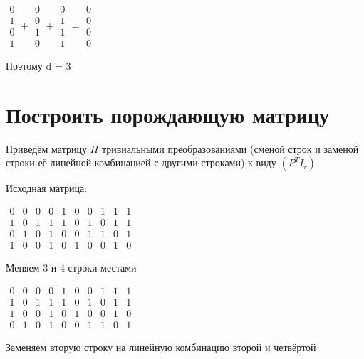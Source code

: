 \documentclass{article}
\begin{document}
	$
	\begin{array}{c}
	0\\
	1\\
	0\\
	1
	\end{array} + \begin{array}{c}
	0\\
	0\\
	1\\
	0
	\end{array} + \begin{array}{c}
	0\\
	1\\
	1\\
	1
	\end{array} = \begin{array}{c}
	0\\
	0\\
	0\\
	0
	\end{array}
	$
	
	Поэтому d = 3
	
	\section{Построить порождающую матрицу}
	Приведём матрицу $H$ тривиальными преобразованиями (сменой строк и заменой строки её линейной комбинацией с другими строками) к виду $(P^T I_r)$
	
	Исходная матрица:
	
	$
	\begin{array}{cccccccccc}
	0 & 0 & 0 & 0 & 1 & 0 & 0 & 1 & 1 & 1\\
	1 & 0 & 1 & 1 & 1 & 0 & 1 & 0 & 1 & 1\\
	0 & 1 & 0 & 1 & 0 & 0 & 1 & 1 & 0 & 1\\
	1 & 0 & 0 & 1 & 0 & 1 & 0 & 0 & 1 & 0
	\end{array}
	$
	
	Меняем 3 и 4 строки местами
	
	$
	\begin{array}{cccccccccc}
	0 & 0 & 0 & 0 & 1 & 0 & 0 & 1 & 1 & 1\\
	1 & 0 & 1 & 1 & 1 & 0 & 1 & 0 & 1 & 1\\
	1 & 0 & 0 & 1 & 0 & 1 & 0 & 0 & 1 & 0 \\
	0 & 1 & 0 & 1 & 0 & 0 & 1 & 1 & 0 & 1
	\end{array}
	$
	
	Заменяем вторую строку на линейную комбинацию второй и четвёртой
	
\end{document}
